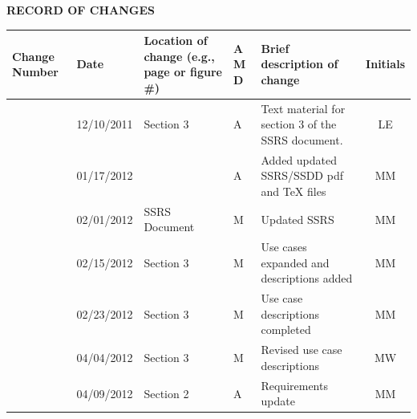 \documentclass[twoside,letterpaper]{article}
\begin{document}


\bigskip


{\centering\bfseries RECORD OF CHANGES \par}


\bigskip

\begin{flushleft}
\tablehead{}
\begin{supertabular}[c]{|m{0.75in}|m{1.0in}|m{1.5in}|m{0.25in}|m{2in}|c|}
\hline

\centering \bfseries Change
\centering \bfseries Number
&

\centering \bfseries Date
\par
&

\centering \bfseries Location of change\newline
\centering \bfseries(e.g., page or figure \#)
&

\centering \bfseries A\newline
\centering \bfseries M\newline
\centering \bfseries D  
&

\centering \bfseries Brief description\newline
\centering \bfseries of change
&
\bfseries Initials
\\\hline

& 12/10/2011
& Section 3
& \centering A
& Text material for section 3 of the SSRS document.
& LE

\\\hline
{}
& 01/17/2012
& ~
& \centering A
& Added updated SSRS/SSDD pdf and TeX files
& MM

\\\hline
{}
& 02/01/2012
& SSRS Document
& \centering M
& Updated SSRS
& MM

\\\hline
{}
& 02/15/2012
& Section 3
& \centering M
& Use cases expanded and descriptions added
& MM

\\\hline
{}
& 02/23/2012
& Section 3
& \centering M
& Use case descriptions completed
& MM

\\\hline
{}
& 04/04/2012
& Section 3
& \centering M
& Revised use case descriptions
& MW

\\\hline
{}
& 04/09/2012
& Section 2
& \centering A
& Requirements update
& MM


\end{supertabular}
\end{flushleft}
\end{document}
